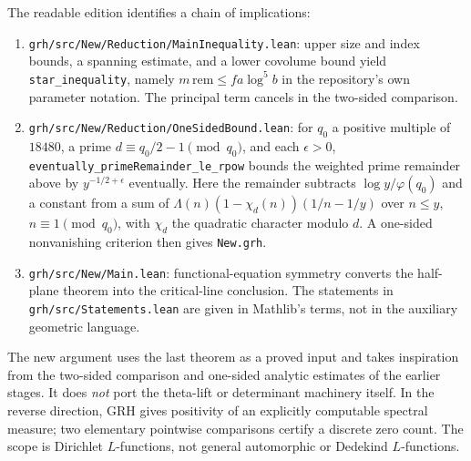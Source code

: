 \documentclass[11pt]{article}
\theoremstyle{remark}\newtheorem{remark}[theorem]{Remark}
\begin{document}
The readable edition identifies a chain of implications:
\begin{enumerate}
\item \texttt{grh/src/New/Reduction/MainInequality.lean}: upper size and index bounds, a spanning estimate, and a lower covolume bound yield \texttt{star\_inequality}, namely $m\,\mathrm{rem}\le fa\log^5 b$ in the repository's own parameter notation. The principal term cancels in the two-sided comparison.
\item \texttt{grh/src/New/Reduction/OneSidedBound.lean}: for $q_0$ a positive multiple of $18480$, a prime $d\equiv q_0/2-1\pmod{q_0}$, and each $\epsilon>0$, \texttt{eventually\_primeRemainder\_le\_rpow} bounds the weighted prime remainder above by $y^{-1/2+\epsilon}$ eventually. Here the remainder subtracts $\log y/\varphi(q_0)$ and a constant from a sum of $\Lambda(n)(1-\chi_d(n))(1/n-1/y)$ over $n\le y$, $n\equiv1\pmod{q_0}$, with $\chi_d$ the quadratic character modulo $d$. A one-sided nonvanishing criterion then gives \texttt{New.grh}.
\item \texttt{grh/src/New/Main.lean}: functional-equation symmetry converts the half-plane theorem into the critical-line conclusion. The statements in \texttt{grh/src/Statements.lean} are given in Mathlib's terms, not in the auxiliary geometric language.
\end{enumerate}
The new argument uses the last theorem as a proved input and takes inspiration from the two-sided comparison and one-sided analytic estimates of the earlier stages. It does \emph{not} port the theta-lift or determinant machinery itself. In the reverse direction, GRH gives positivity of an explicitly computable spectral measure; two elementary pointwise comparisons certify a discrete zero count. The scope is Dirichlet $L$-functions, not general automorphic or Dedekind $L$-functions.
\end{document}
